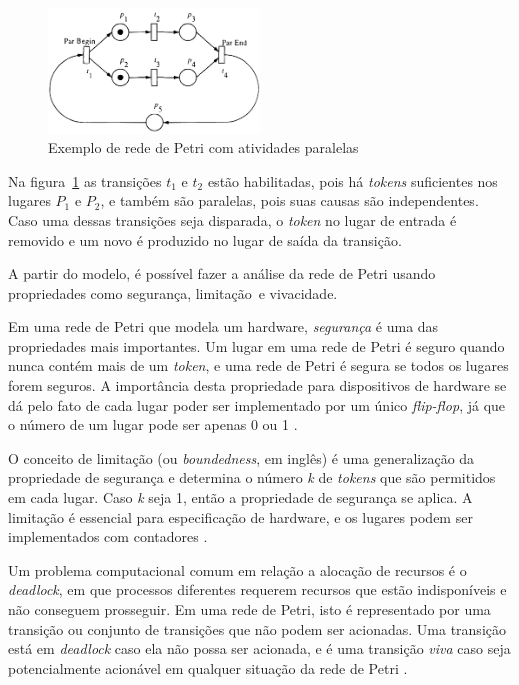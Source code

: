 \begin{figure}[ht]
	\caption{\label{fig:petrinet}Exemplo de rede de Petri com atividades paralelas}
	\begin{center}
	    \includegraphics[width=0.5\textwidth]{resources/petri_net_murata_1}
	\end{center}
\end{figure}

Na figura~\ref{fig:petrinet} as transições $t_1$ e $t_2$ estão habilitadas, pois há \textit{tokens} suficientes nos lugares $P_1$ e $P_2$, e também são paralelas, pois suas causas são independentes. Caso uma dessas transições seja disparada, o \textit{token} no lugar de entrada é removido e um novo é produzido no lugar de saída da transição.

A partir do modelo, é possível fazer a análise da rede de Petri usando propriedades como segurança, limitação\ e vivacidade.

Em uma rede de Petri que modela um hardware, \textit{segurança} é uma das propriedades mais importantes. Um lugar em uma rede de Petri é seguro quando nunca contém mais de um \textit{token}, e uma rede de Petri é segura se todos os lugares forem seguros. A importância desta propriedade para dispositivos de hardware se dá pelo fato de cada lugar poder ser implementado por um único \textit{flip-flop}, já que o número de um lugar pode ser apenas 0 ou 1 \cite{peterson:1981}.

O conceito de limitação (ou \textit{boundedness}, em inglês) é uma generalização da propriedade de segurança e determina o número \textit{k} de \textit{tokens} que são permitidos em cada lugar. Caso \textit{k} seja 1, então a propriedade de segurança se aplica. A limitação é essencial para especificação de hardware, e os lugares podem ser implementados com contadores \cite{peterson:1981}.

Um problema computacional comum em relação a alocação de recursos é o \textit{deadlock}, em que processos diferentes requerem recursos que estão indisponíveis e não conseguem prosseguir. Em uma rede de Petri, isto é representado por uma transição ou conjunto de transições que não podem ser acionadas. Uma transição está em \textit{deadlock} caso ela não possa ser acionada, e é uma transição \textit{viva} caso seja potencialmente acionável em qualquer situação da rede de Petri \cite{peterson:1981}.

